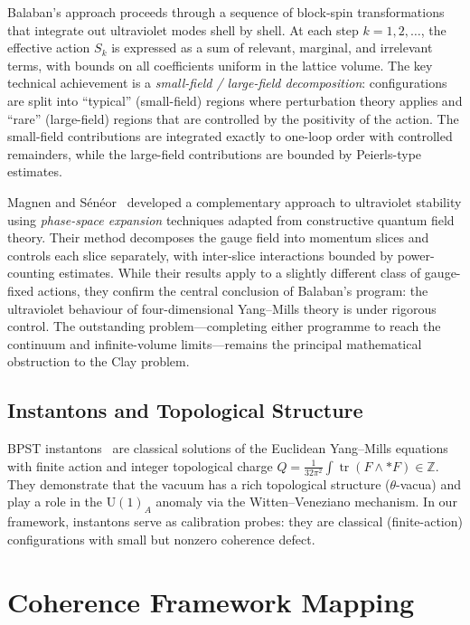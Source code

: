 \documentclass[11pt]{article}
\DeclareMathOperator{\tr}{tr}
\begin{document}
Balaban's approach proceeds through a sequence of block-spin
transformations that integrate out ultraviolet modes shell by shell.
At each step $k = 1, 2, \ldots$, the effective action $S_k$ is
expressed as a sum of relevant, marginal, and irrelevant terms, with
bounds on all coefficients uniform in the lattice volume.  The key
technical achievement is a \emph{small-field / large-field decomposition}:
configurations are split into ``typical'' (small-field) regions where
perturbation theory applies and ``rare'' (large-field) regions that
are controlled by the positivity of the action.  The small-field
contributions are integrated exactly to one-loop order with controlled
remainders, while the large-field contributions are bounded by Peierls-type
estimates.

Magnen and S\'en\'eor~\cite{MagSen} developed a complementary approach
to ultraviolet stability using \emph{phase-space expansion} techniques
adapted from constructive quantum field theory.  Their method decomposes
the gauge field into momentum slices and controls each slice separately,
with inter-slice interactions bounded by power-counting estimates.  While
their results apply to a slightly different class of gauge-fixed actions,
they confirm the central conclusion of Balaban's program: the ultraviolet
behaviour of four-dimensional Yang--Mills theory is under rigorous control.
The outstanding problem---completing either programme to reach the
continuum and infinite-volume limits---remains the principal mathematical
obstruction to the Clay problem.

\subsection{Instantons and Topological Structure}

BPST instantons~\cite{BPST} are classical solutions of the Euclidean
Yang--Mills equations with finite action and integer topological charge
$Q = \frac{1}{32\pi^2}\int \tr(F \wedge {*F}) \in \mathbb{Z}$.
They demonstrate that the vacuum has a rich topological structure
($\theta$-vacua) and play a role in the $\mathrm{U}(1)_A$ anomaly via
the Witten--Veneziano mechanism.  In our framework, instantons serve as
calibration probes: they are classical (finite-action) configurations
with small but nonzero coherence defect.

\section{Coherence Framework Mapping}
\label{sec:framework}
\end{document}
